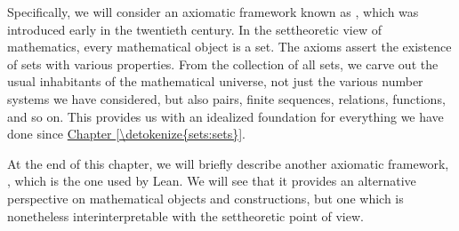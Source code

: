 \documentclass[letterpaper,10pt,english]{sphinxmanual}
\begin{document}
\sphinxAtStartPar
Specifically, we will consider an axiomatic framework known as , which was introduced early in the twentieth century. In the set\sphinxhyphen{}theoretic view of mathematics, every mathematical object is a set. The axioms assert the existence of sets with various properties. From the collection of all sets, we carve out the usual inhabitants of the mathematical universe, not just the various number systems we have considered, but also pairs, finite sequences, relations, functions, and so on. This provides us with an idealized foundation for everything we have done since \hyperref[\detokenize{sets:sets}]{Chapter \ref{\detokenize{sets:sets}}}.

\sphinxAtStartPar
At the end of this chapter, we will briefly describe another axiomatic framework, , which is the one used by Lean. We will see that it provides an alternative perspective on mathematical objects and constructions, but one which is nonetheless inter\sphinxhyphen{}interpretable with the set\sphinxhyphen{}theoretic point of view.
\end{document}
